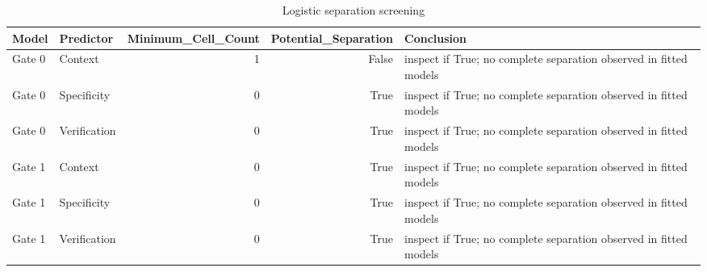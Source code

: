 \begin{table}
\caption{Logistic separation screening}
\label{tab:separation}
\begin{tabular}{llrrl}
\toprule
Model & Predictor & Minimum\_Cell\_Count & Potential\_Separation & Conclusion \\
\midrule
Gate 0 & Context & 1 & False & inspect if True; no complete separation observed in fitted models \\
Gate 0 & Specificity & 0 & True & inspect if True; no complete separation observed in fitted models \\
Gate 0 & Verification & 0 & True & inspect if True; no complete separation observed in fitted models \\
Gate 1 & Context & 0 & True & inspect if True; no complete separation observed in fitted models \\
Gate 1 & Specificity & 0 & True & inspect if True; no complete separation observed in fitted models \\
Gate 1 & Verification & 0 & True & inspect if True; no complete separation observed in fitted models \\
\bottomrule
\end{tabular}
\end{table}
